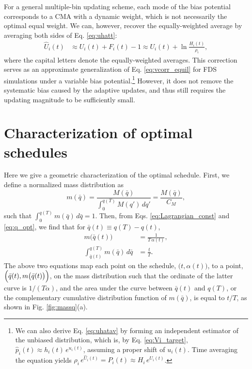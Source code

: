 \documentclass[preprint, superscriptaddress, floatfix]{revtex4-1}
\begin{document}
For a general multiple-bin updating scheme,
each mode of the bias potential
corresponds to a CMA with a dynamic weight,
which is not necessarily the optimal equal weight.
%
We can, however, recover the equally-weighted average
by averaging both sides of Eq. \eqref{eq:uhatt}:
%
\begin{align}
  \hat U_i(t)
  &\approx
  U_i (t)
  + F_i(t) - 1
  \approx
  U_i(t)
  + \ln \frac{ H_i(t) } { \rho_i }
  ,
  \label{eq:uhatav}
\end{align}
%
where the capital letters denote the equally-weighted averages.
%
This correction serves as
an approximate generalization of Eq. \eqref{eq:vcorr_equil}
for FDS simulations under
a variable bias potential.\footnote{We can also
  derive Eq. \eqref{eq:uhatav}
  by forming an independent estimator
  of the unbiased distribution\cite{marsili2006},
  which is, by Eq. \eqref{eq:Vi_target},
  $\hat p_i(t) \approx h_i(t) \, e^{ u_i(t) }$,
  assuming a proper shift of $u_i(t)$.
  Time averaging the equation yields
  $\rho_i \, e^{\hat U_i(t)} = \hat P_i(t) \approx H_i \, e^{ U_i(t) }$.}
%
However, it does not remove the systematic bias
caused by the adaptive updates,
and thus still requires the updating magnitude
to be sufficiently small.







\section{\label{sec:schedule_geometry}
Characterization of optimal schedules}



Here we give a geometric characterization
of the optimal schedule.
%
First, we define a normalized mass distribution as
%
\begin{equation}
  m(\bar q)
  =
  \frac{
    M(\bar q)
  }
  {
    \int_0^{ q(T) } M(q') \, d q'
  }
  =
  \frac{
    M(\bar q)
  }
  {
    C_M
  }
  ,
  \label{eq:mass_distr}
\end{equation}
%
such that
$\int_0^{q(T)} m(\bar q) \, d\bar q = 1$.
%
Then, from Eqs. \eqref{eq:Lagrangian_const} and \eqref{eq:q_opt},
we find that for $\bar q(t) \equiv q(T) - q(t)$,
%
\begin{align}
  m\bigl( \bar q(t) \bigr)
  &=
  \frac{ 1 }
       { T \, \alpha(t) }
  ,
  \label{eq:mQ_invTa}
  \\
  \int_{\bar q(t)}^{ q(T) }
    \!\! m(\bar q) \, d \bar q
  &=
  \frac t T
  .
  \label{eq:intmQ_tT}
\end{align}
%
The above two equations map each point on the schedule,
$\bigl(t, \alpha(t)\bigr)$,
to a point,
$\Bigl(\bar q(t), m\bigl(\bar q(t)\bigr)\Bigr)$,
on the mass distribution
such that the ordinate of the latter curve
is $1/(T\alpha)$,
and the area under the curve between $\bar q(t)$ and $q(T)$,
or the complementary cumulative distribution function of $m(\bar q)$,
is equal to $t/T$,
as shown in Fig. \ref{fig:massq}(a).
\end{document}
